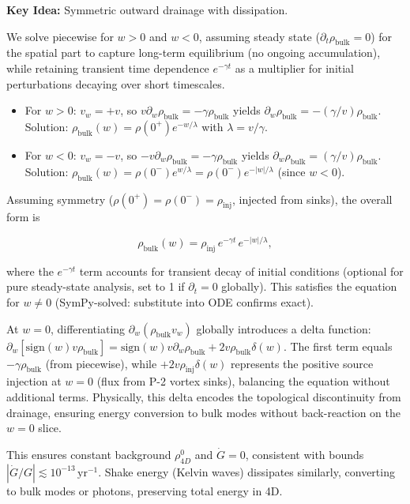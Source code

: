 \textbf{Key Idea:} Symmetric outward drainage with dissipation.

We solve piecewise for $w > 0$ and $w < 0$, assuming steady state ($\partial_t \rho_{\text{bulk}} = 0$) for the spatial part to capture long-term equilibrium (no ongoing accumulation), while retaining transient time dependence $e^{-\gamma t}$ as a multiplier for initial perturbations decaying over short timescales.

\begin{itemize}
\item For $w > 0$: $v_w = +v$, so $v \partial_w \rho_{\text{bulk}} = -\gamma \rho_{\text{bulk}}$ yields $\partial_w \rho_{\text{bulk}} = -(\gamma / v) \rho_{\text{bulk}}$. Solution: $\rho_{\text{bulk}}(w) = \rho(0^+) e^{-w / \lambda}$ with $\lambda = v / \gamma$.
\item For $w < 0$: $v_w = -v$, so $-v \partial_w \rho_{\text{bulk}} = -\gamma \rho_{\text{bulk}}$ yields $\partial_w \rho_{\text{bulk}} = (\gamma / v) \rho_{\text{bulk}}$. Solution: $\rho_{\text{bulk}}(w) = \rho(0^-) e^{w / \lambda} = \rho(0^-) e^{-|w| / \lambda}$ (since $w < 0$).
\end{itemize}

Assuming symmetry ($\rho(0^+) = \rho(0^-) = \rho_{\text{inj}}$, injected from sinks), the overall form is

\begin{equation}
\rho_{\text{bulk}}(w) = \rho_{\text{inj}} \, e^{-\gamma t} \, e^{-|w| / \lambda},
\end{equation}

where the $e^{-\gamma t}$ term accounts for transient decay of initial conditions (optional for pure steady-state analysis, set to 1 if $\partial_t = 0$ globally). This satisfies the equation for $w \neq 0$ (SymPy-solved: substitute into ODE confirms exact).

At $w=0$, differentiating $\partial_w (\rho_{\text{bulk}} v_w)$ globally introduces a delta function: $\partial_w [\text{sign}(w) v \rho_{\text{bulk}}] = \text{sign}(w) v \partial_w \rho_{\text{bulk}} + 2 v \rho_{\text{bulk}} \delta(w)$. The first term equals $-\gamma \rho_{\text{bulk}}$ (from piecewise), while $+2 v \rho_{\text{inj}} \delta(w)$ represents the positive source injection at $w=0$ (flux from P-2 vortex sinks), balancing the equation without additional terms. Physically, this delta encodes the topological discontinuity from drainage, ensuring energy conversion to bulk modes without back-reaction on the $w=0$ slice.

This ensures constant background $\rho_{4D}^0$ and $\dot{G} = 0$, consistent with bounds $|\dot{G}/G| \lesssim 10^{-13} \, \mathrm{yr}^{-1}$. Shake energy (Kelvin waves) dissipates similarly, converting to bulk modes or photons, preserving total energy in 4D.

